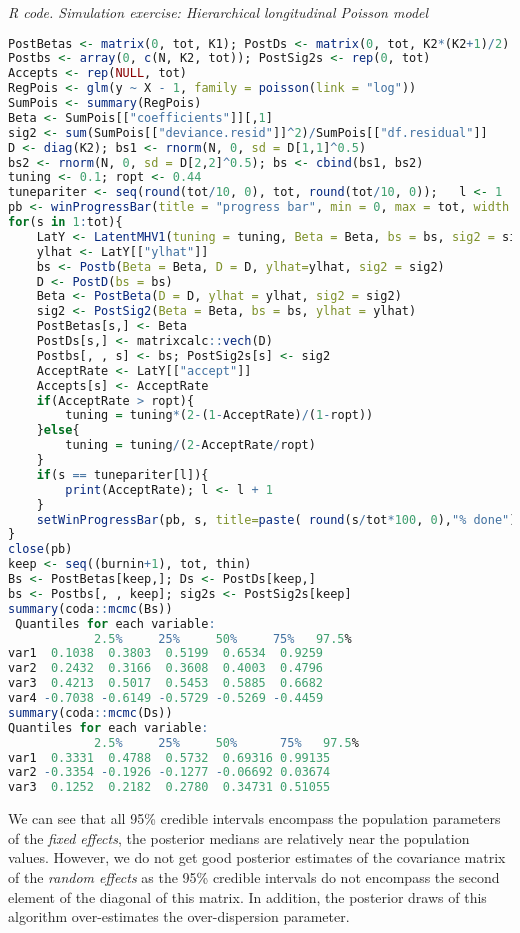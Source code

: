 \begin{tcolorbox}[enhanced,width=4.67in,center upper,
	fontupper=\large\bfseries,drop shadow southwest,sharp corners]
	\textit{R code. Simulation exercise: Hierarchical longitudinal Poisson model}
	\begin{VF}
		\begin{lstlisting}[language=R]
PostBetas <- matrix(0, tot, K1); PostDs <- matrix(0, tot, K2*(K2+1)/2)
Postbs <- array(0, c(N, K2, tot)); PostSig2s <- rep(0, tot)
Accepts <- rep(NULL, tot)
RegPois <- glm(y ~ X - 1, family = poisson(link = "log"))
SumPois <- summary(RegPois)
Beta <- SumPois[["coefficients"]][,1]
sig2 <- sum(SumPois[["deviance.resid"]]^2)/SumPois[["df.residual"]]
D <- diag(K2); bs1 <- rnorm(N, 0, sd = D[1,1]^0.5)
bs2 <- rnorm(N, 0, sd = D[2,2]^0.5); bs <- cbind(bs1, bs2)
tuning <- 0.1; ropt <- 0.44
tunepariter <- seq(round(tot/10, 0), tot, round(tot/10, 0));   l <- 1
pb <- winProgressBar(title = "progress bar", min = 0, max = tot, width = 300)
for(s in 1:tot){
	LatY <- LatentMHV1(tuning = tuning, Beta = Beta, bs = bs, sig2 = sig2)
	ylhat <- LatY[["ylhat"]]
	bs <- Postb(Beta = Beta, D = D, ylhat=ylhat, sig2 = sig2)
	D <- PostD(bs = bs)
	Beta <- PostBeta(D = D, ylhat = ylhat, sig2 = sig2)
	sig2 <- PostSig2(Beta = Beta, bs = bs, ylhat = ylhat)
	PostBetas[s,] <- Beta
	PostDs[s,] <- matrixcalc::vech(D)
	Postbs[, , s] <- bs; PostSig2s[s] <- sig2
	AcceptRate <- LatY[["accept"]]
	Accepts[s] <- AcceptRate
	if(AcceptRate > ropt){
		tuning = tuning*(2-(1-AcceptRate)/(1-ropt))
	}else{
		tuning = tuning/(2-AcceptRate/ropt)
	}
	if(s == tunepariter[l]){
		print(AcceptRate); l <- l + 1
	}
	setWinProgressBar(pb, s, title=paste( round(s/tot*100, 0),"% done"))
}
close(pb)
keep <- seq((burnin+1), tot, thin)
Bs <- PostBetas[keep,]; Ds <- PostDs[keep,]
bs <- Postbs[, , keep]; sig2s <- PostSig2s[keep]
summary(coda::mcmc(Bs))
 Quantiles for each variable:
			2.5%     25%     50%     75%   97.5%
var1  0.1038  0.3803  0.5199  0.6534  0.9259
var2  0.2432  0.3166  0.3608  0.4003  0.4796
var3  0.4213  0.5017  0.5453  0.5885  0.6682
var4 -0.7038 -0.6149 -0.5729 -0.5269 -0.4459
summary(coda::mcmc(Ds))
Quantiles for each variable:
			2.5%     25%     50%      75%   97.5%
var1  0.3331  0.4788  0.5732  0.69316 0.99135
var2 -0.3354 -0.1926 -0.1277 -0.06692 0.03674
var3  0.1252  0.2182  0.2780  0.34731 0.51055
\end{lstlisting}
	\end{VF}
\end{tcolorbox}
We can see that all 95\% credible intervals encompass the population parameters of the \textit{fixed effects}, the posterior medians are relatively near the population values. However, we do not get good posterior estimates of the covariance matrix of the \textit{random effects} as the 95\% credible intervals do not encompass the second element of the diagonal of this matrix. In addition, the posterior draws of this algorithm over-estimates the over-dispersion parameter.

